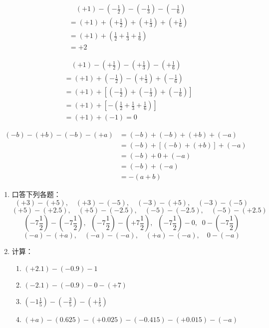 \begin{solution}
	\begin{align*}
	&\quad   (+1)-\left(-\frac{1}{2}\right)-\left(-\frac{1}{3}\right)-\left(-\frac{1}{6}\right)\\
	&= (+1)+\left(+\frac{1}{2}\right)+\left(+\frac{1}{3}\right)+\left(+\frac{1}{6}\right)\tag{减法法则}\\
	&=(+1)+\left(\frac{1}{2}+\frac{1}{3}+\frac{1}{6}\right)\tag{同号相加法则}\\
	&=+2
	\end{align*}   
	
	\begin{align*}
	&\quad    (+1)-\left(+\frac{1}{2}\right)-\left(+\frac{1}{3}\right)-\left(+\frac{1}{6}\right)\\
	&=(+1)+\left(-\frac{1}{2}\right)-\left(+\frac{1}{3}\right)+\left(-\frac{1}{6}\right)\tag{减法法则}\\
	&=(+1)+\left[ \left(-\frac{1}{2}\right)+\left(-\frac{1}{3}\right) +\left(-\frac{1}{6}\right)\right]  \tag{加法结合律}\\
	&=(+1)+\left[-\left(\frac{1}{2}+\frac{1}{3}+\frac{1}{6}\right)\right]\tag{同号相加法则}  \\
	&=(+1)+(-1)=0  \tag{相反数性质}
	\end{align*}   
	
	\begin{align*}
	(-b)-(+b)-(-b)-(+a)&=(-b)+(-b)+(+b)+(-a)\tag{减法法则}\\
	&=(-b)+[(-b)+(+b)]+(-a)  \tag{加法结合律}\\
	&=(-b)+0+(-a) \tag{相反数意义}\\
	&=(-b)+(-a) \tag{零的特征}\\
	&=-(a+b)  \tag{同号相加法则}    
	\end{align*}   
\end{solution}

\begin{ex}
	\begin{enumerate}
		\item 口答下列各题：
		\[(+3)-(+5),\quad (+3)-(-5),\quad (-3)-(+5),\quad (-3)-(-5) \]
		\[(+5)-(+2.5),\quad  (+5)-(-2.5),\quad (-5)-(-2.5),\quad (-5)-(+2.5)\]
		\[\left(-7\frac{1}{2}\right)-\left(-7\frac{1}{2}\right),\;\; \left(-7\frac{1}{2}\right)-\left(+7\frac{1}{2}\right),\;\; \left(-7\frac{1}{2}\right)-0,\;\; 0-\left(-7\frac{1}{2}\right) \]
		\[(-a)-(+a),\quad (-a)-(-a),\quad (+a)-(-a),\quad 0-(-a)\]
		
		\item 计算：
		\begin{enumerate}
			\item $(+2.1)-(-0.9)-1$
			\item $(-2.1)-(-0.9)-0-(+7)$
			\item $\left(-1\frac{1}{5}\right)-\left(-\frac{3}{5}\right)-\left(+\frac{1}{5}\right)$
			\item $(+a)-(0.625)-(+0.025)-(-0.415)-(+0.015)-(-a)$
		\end{enumerate}
	\end{enumerate}  
\end{ex}

